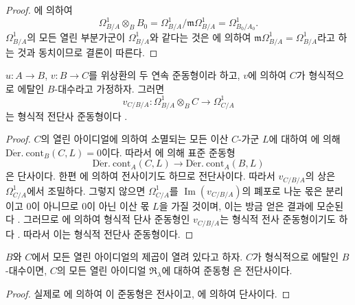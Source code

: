 \begin{proof}
에 의하여
\[
  \Omega^1_{B/A}\otimes_B B_0
  =\Omega^1_{B/A}/\mathfrak m\Omega^1_{B/A}
  =\Omega^1_{B_0/A_0}.
\]
$\Omega^1_{B/A}$의 모든 열린 부분가군이 $\Omega^1_{B/A}$와 같다는
것은 에 의하여
$\mathfrak m\Omega^1_{B/A}=\Omega^1_{B/A}$라고 하는 것과 동치이므로
결론이 따른다.
\end{proof}

\begin{proposition}[20.7.6]
\label{0.20.7.6-ko}
$u:A\to B$, $v:B\to C$를 위상환의 두 연속 준동형이라 하고, $v$에
의하여 $C$가 형식적으로 에탈인 $B$-대수라고 가정하자. 그러면
\[
  v_{C/B/A}:\Omega^1_{B/A}\otimes_B C\longrightarrow\Omega^1_{C/A}
\]
는 형식적 전단사 준동형이다 .
\end{proposition}

\begin{proof}
$C$의 열린 아이디얼에 의하여 소멸되는 모든 이산 $C$-가군 $L$에
대하여 에 의해
$\operatorname{D\acute{e}r.\ cont}_B(C,L)=0$이다. 따라서
에 의해 표준 준동형
\[
  \operatorname{D\acute{e}r.\ cont}_A(C,L)\longrightarrow
  \operatorname{D\acute{e}r.\ cont}_A(B,L)
\]
은 단사이다. 한편 에 의하여 전사이기도 하므로
전단사이다. 따라서 $v_{C/B/A}$의 상은 $\Omega^1_{C/A}$에서 조밀하다.
그렇지 않으면 $\Omega^1_{C/A}$를 $\operatorname{Im}(v_{C/B/A})$의
폐포로 나눈 몫은 분리이고 $0$이 아니므로 $0$이 아닌 이산 몫
$L$을 가질 것이며, 이는 방금 얻은 결과에 모순된다
. 그러므로 에 의하여 형식적 단사
준동형인 $v_{C/B/A}$는 형식적 전사 준동형이기도 하다
. 따라서 이는 형식적 전단사 준동형이다.
\end{proof}

\begin{corollary}[20.7.7]
\label{0.20.7.7-ko}
$B$와 $C$에서 모든 열린 아이디얼의 제곱이 열려 있다고 하자. $C$가
형식적으로 에탈인 $B$-대수이면, $C$의 모든 열린 아이디얼
$\mathfrak R_\lambda$에 대하여 준동형 은
전단사이다.
\end{corollary}

\begin{proof}
실제로 에 의하여 이 준동형은 전사이고,
에 의하여 단사이다.
\end{proof}

